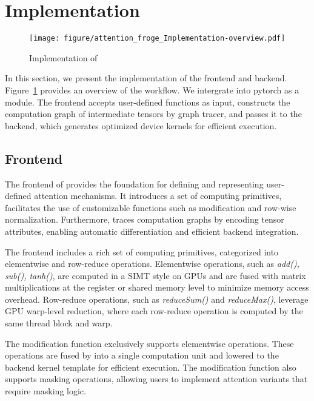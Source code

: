 \section{Implementation}
\label{sec:impl}

\begin{figure}
    \centering
    \texttt{[image: figure/attention\_froge\_Implementation-overview.pdf]}
  \vspace{-3mm}
    \caption{Implementation of \oursys{}}
    \vspace{-5mm}
    \label{fig:implementation}
\end{figure}

In this section, we present the implementation of the \oursys{} frontend and backend. Figure~\ref{fig:implementation} provides an overview of the \oursys{} workflow. We intergrate \oursys{} into pytorch\cite{pytorch} as a module. The frontend accepts user-defined functions as input, constructs the computation graph of intermediate tensors by graph tracer, and passes it to the backend, which generates optimized device kernels for efficient execution.

\subsection{Frontend}
\label{sec:frontend}

The frontend of \oursys{} provides the foundation for defining and representing user-defined attention mechanisms. It introduces a set of computing primitives, facilitates the use of customizable functions such as modification and row-wise normalization. Furthermore, \oursys{} traces computation graphs by encoding tensor attributes, enabling automatic differentiation and efficient backend integration.

The frontend includes a rich set of computing primitives, categorized into elementwise and row-reduce operations. Elementwise operations, such as \textit{add(), sub(), tanh()}, are computed in a SIMT style on GPUs and are fused with matrix multiplications at the register or shared memory level to minimize memory access overhead. Row-reduce operations, such as \textit{reduceSum()} and \textit{reduceMax()}, leverage GPU warp-level reduction, where each row-reduce operation is computed by the same thread block and warp. 

The modification function exclusively supports elementwise operations. These operations are fused by \oursys{} into a single computation unit and lowered to the backend kernel template for efficient execution. The modification function also supports masking operations, allowing users to implement attention variants that require masking logic.

